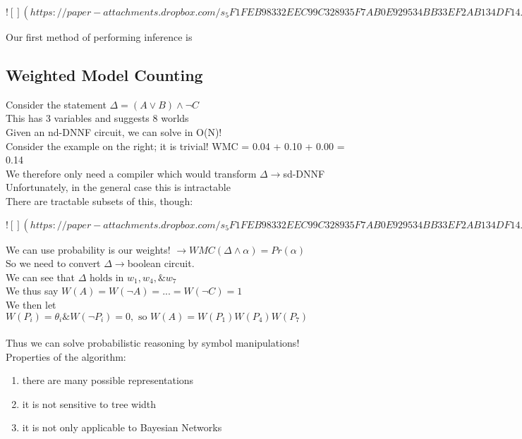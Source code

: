 \documentclass[../../lecture_notes.tex]{subfiles}
\begin{document}
\newpage
$![](https://paper-attachments.dropbox.com/s_5F1FEB98332EEC99C328935F7AB0E929534BB33EF2AB134DF14A85072ADC65A0_1590224552818_Untitled+drawing+6.jpg)$
\newpage

\noindent Our first method of performing inference is
\subsection*{Weighted Model Counting}
\noindent Consider the statement $\Delta = (A \lor B) \land\neg C$\\ 
	\indent This has 3 variables and suggests 8 worlds\\
	\indent Given an nd-DNNF circuit, we can solve in O(N)!\\
	\indent Consider the example on the right; it is trivial! WMC = 0.04 + 0.10 + 0.00 = 0.14\\
	\indent We therefore only need a compiler which would transform $\Delta \rightarrow$sd-DNNF\\
	\indent Unfortunately, in the general case this is intractable\\
There are tractable subsets of this, though:

\newpage
$![](https://paper-attachments.dropbox.com/s_5F1FEB98332EEC99C328935F7AB0E929534BB33EF2AB134DF14A85072ADC65A0_1590225097526_Untitled+drawing+7.jpg)$
\newpage

\noindent We can use probability is our weights! $ \rightarrow WMC(\Delta\land\alpha) = Pr(\alpha)$\\
So we need to convert $\Delta \rightarrow$boolean circuit.\\
We can see that $\Delta \text{ holds in } w_1, w_4, \& w_7$\\
We thus say $W(A) = W(\neg A) = ... = W(\neg C) = 1$\\
We then let $W(P_i) = \theta_i \& W(\neg P_i) = 0, \text{ so } W(A) = W(P_1) W(P_4) W(P_7)$\\
\\
Thus we can solve probabilistic reasoning by symbol manipulations!\\
Properties of the algorithm:
	\begin{enumerate} [itemsep=0mm]
		\item there are many possible representations
		\item it is not sensitive to tree width
		\item it is not only applicable to Bayesian Networks
	\end{enumerate} \medskip
\end{document}
